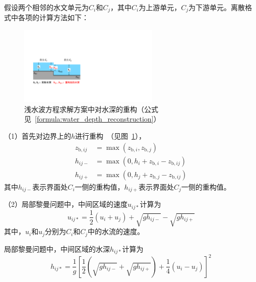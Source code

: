 假设两个相邻的水文单元为$C_i$和$C_j$，其中$C_i$为上游单元，$C_j$为下游单元。离散格式中各项的计算方法如下：

{
  \begin{figure}[htbp]
    \centering
    \includegraphics[width=0.6\textwidth]{Figures/侧向流/水深重构.pdf}
    \caption[浅水波方程求解方案中对水深的重构]{浅水波方程求解方案中对水深的重构（公式见~\ref{formula:water_depth_reconstruction}）}
    \label{fig:水深重构}
  \end{figure}
}

（1）首先对边界上的$h$进行重构~\citep{audusse2004scientificcomputing}（见图~\ref{fig:水深重构}），
\begin{equation} \label{formula:water_depth_reconstruction}
  \begin{aligned}
    z_{\mathrm{b},ij} & = \max\left(z_{\mathrm{b},i}, z_{\mathrm{b},j}\right) \\
    h_{ij-} & =  \max\left(0, h_i + z_{\mathrm{b},i} - z_{\mathrm{b},ij} \right) \\
    h_{ij+} & =  \max\left(0, h_j + z_{\mathrm{b},j} - z_{\mathrm{b},ij} \right)
  \end{aligned}
\end{equation}
其中$h_{ij-}$表示界面处$C_i$一侧的重构值，$h_{ij+}$表示界面处$C_j$一侧的重构值。

（2）局部黎曼问题中，中间区域的速度$u_{ij*}$计算为
\begin{equation}
  u_{ij*} = \frac{1}{2}\left(u_i + u_j\right) + \sqrt{g h_{ij-}} - \sqrt{g h_{ij+}}
\end{equation}
其中，$u_i$和$u_j$分别为$C_i$和$C_j$中的水流的速度。

局部黎曼问题中，中间区域的水深$h_{ij*}$计算为
\begin{equation}
  h_{ij*} = \frac{1}{g}\left[\frac{1}{2}\left(\sqrt{g h_{ij-}} + \sqrt{g h_{ij+}}\right) + \frac{1}{4}\left(u_i - u_j\right)\right]^2
\end{equation}

